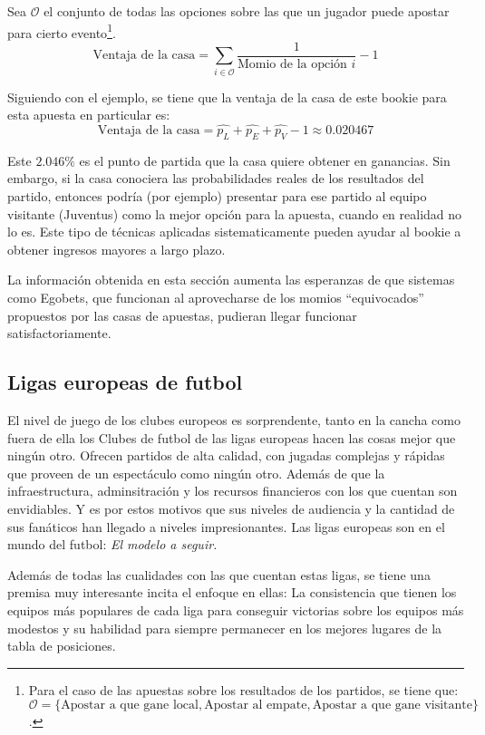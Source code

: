 Sea $\mathcal{O}$ el conjunto de todas las opciones sobre las que un jugador puede apostar para cierto evento\footnote{Para el caso de las apuestas sobre los resultados de los partidos, se tiene que: $\mathcal{O} = \{\text{Apostar a que gane local}, \text{Apostar al empate}, \text{Apostar a que gane visitante}\}$.}.
\[\text{Ventaja de la casa} =  \sum_{i \in \mathcal{O}}{\frac{1}{\text{Momio de la opción } i}} - 1\] 

Siguiendo con el ejemplo, se tiene que la ventaja de la casa de este bookie para esta apuesta en particular es:
\[\text{Ventaja de la casa} = \hat{p_L} + \hat{p_E} + \hat{p_V} - 1 \approx 0.020467\]

Este $2.046\%$ es el punto de partida que la casa quiere obtener en ganancias. Sin embargo, si la casa conociera las probabilidades reales de los resultados del partido, entonces podría (por ejemplo) presentar para ese partido al equipo visitante (Juventus) como la mejor opción para la apuesta, cuando en realidad no lo es. Este tipo de técnicas aplicadas sistematicamente pueden ayudar al bookie a obtener ingresos mayores a largo plazo.

La información obtenida en esta sección aumenta las esperanzas de que sistemas como Egobets, que funcionan al aprovecharse de los momios ``equivocados'' propuestos por las casas de apuestas, pudieran llegar funcionar satisfactoriamente.


\subsection{Ligas europeas de futbol}
El nivel de juego de los clubes europeos es sorprendente, tanto en la cancha como fuera de ella los Clubes de futbol de las ligas europeas hacen las cosas mejor que ningún otro. Ofrecen partidos de alta calidad, con jugadas complejas y rápidas que proveen de un espectáculo como ningún otro. Además de que la infraestructura, adminsitración y los recursos financieros con los que cuentan son envidiables. Y es por estos motivos que sus niveles de audiencia y la cantidad de sus fanáticos han llegado a niveles impresionantes. Las ligas europeas son en el mundo del futbol: \emph{El modelo a seguir.}



Además de todas las cualidades con las que cuentan estas ligas, se tiene una premisa muy interesante incita el enfoque en ellas: La consistencia que tienen los equipos más populares de cada liga para conseguir victorias sobre los equipos más modestos y su habilidad para siempre permanecer en los mejores lugares de la tabla de posiciones. 

